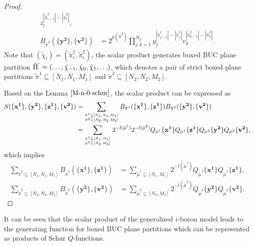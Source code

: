 \documentclass[11pt,reqno]{amsart}
\numberwithin{equation}{section}
\begin{document}
\begin{proof}
\begin{align}
			z_l^{|\tilde{\pi}^{2}_{l-1}| - |\tilde{\pi}^{2}_l|},\\
			B_{\tilde{\pi}^{2} }(\{\mathbf{y^2}\}, \{\mathbf{v^2}\})
			&=2^{p(\tilde{\pi}^2)}
			\prod_{j,k=1}^{N_2}
			y_j^{|\tilde{\pi}^{1}_{j-1}| - |\tilde{\pi}^{1}_j|}
			v_k^{|\tilde{\pi}^{2}_{k-1}| - |\tilde{\pi}^{2}_k|}	.
		\end{align}
		Note that $(\tilde{\chi}_{i})=(\tilde{\pi}_{i}^{1},\tilde{\pi}_{i}^{2})$,
		the scalar product generates   boxed BUC plane partition	 $\tilde{\Pi}^{'}=(\ldots,\tilde{\chi}_{-1},\tilde{\chi}_{0},\\ \tilde{\chi}_{1}, \ldots)$, which denotes a pair of strict boxed plane partitions
		${\tilde{\pi}^{1} \subseteq [N_{1}, N_{1}, M_{1}]}$ and
		$\tilde{\pi}^{2} \subseteq [N_{2}, N_{2}, M_{2}]$.
		
		Based on the Lemma $\ref{M-n-0-schur}$,  the scalar product can be expressed as
		\begin{align}\label{scalar-product-S1-S2}
			S(\{\mathbf{x^1}\}, \{\mathbf{y^2}\}, \{\mathbf{z^1}\}, \{\mathbf{v^2}\})	
			=&
			\sum_{{\tilde{\pi}^{1} \subseteq [N_{1}, N_{1}, M_{1}]}
				\atop{\tilde{\pi}^{2} \subseteq [N_{2}, N_{2}, M_{2}]}}
			B_{\tilde{\pi}^{1} }(\{\mathbf{x^1}\}, \{\mathbf{z^1}\}) B_{\tilde{\pi}^{2} }(\{\mathbf{y^2}\}, \{\mathbf{v^2}\})\notag\\
			=&\sum_{{ \tilde{\mu}^{1} \subseteq [N_1,M_1]}\atop{\tilde{\mu}^{2} \subseteq [N_2,M_2]}}
			2^{- l(\tilde{\mu}^{1})}	2^{- l(\tilde{\mu}^{2})}	
			Q_{\tilde{\mu}^{1}}\{\mathbf{x^1}\}  Q_{\tilde{\mu}^{1}}\{\mathbf{z^1}\}
			Q_{\tilde{\mu}^{2}}\{\mathbf{y^2}\}  Q_{\tilde{\mu}^{2}}\{\mathbf{v^2}\} ,
		\end{align}	
		which implies
		\begin{align}
			\sum_{\tilde{\pi}^{1} \subseteq [N_{1}, N_{1}, M_{1}]}		
			B_{\tilde{\pi}^{1} }(\{\mathbf{x^1}\}, \{\mathbf{z^1}\})
			&=
			\sum_{ \tilde{\mu}^{1} \subseteq [N_1,M_1]}
			2^{- l(\tilde{\mu}^{1})}
			Q_{\tilde{\mu}^{1}}\{\mathbf{x^1}\}  Q_{\tilde{\mu}^{1}}\{\mathbf{z^1}\}, \\
			\sum_{\tilde{\pi}^{2} \subseteq [N_{2}, N_{2}, M_{2}]}
			B_{\tilde{\pi}^{2} }(\{\mathbf{y^2}\}, \{\mathbf{v^2}\})
			&=\sum_{\tilde{\mu}^{2} \subseteq [N_2,M_2]}
			2^{- l(\tilde{\mu}^{2})}	
			Q_{\tilde{\mu}^{2}}\{\mathbf{y^2}\}
			Q_{\tilde{\mu}^{2}}\{\mathbf{v^2}\}.
		\end{align}
	\end{proof}
	It can be seen that the scalar product of the   generalized $i$-boson model leads to the generating function for  boxed BUC plane partitions which can
	be  represented as products of Schur $Q$-functions.
	
\end{document}
